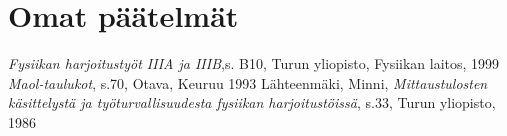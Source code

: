 \documentclass[a4paper,12pt]{article}
\begin{document}

\section{Omat päätelmät}




\newpage
\renewcommand{\refname}{Kirjallisuus}           %

\begin{thebibliography}{9}
 \emph{Fysiikan harjoitustyöt IIIA ja IIIB},s. B10, Turun yliopisto,
Fysiikan laitos, 1999 
 \emph{Maol-taulukot}, s.70, Otava, Keuruu 1993
 Lähteenmäki, Minni, \emph{Mittaustulosten käsittelystä ja työturvallisuudesta
fysiikan harjoitustöissä}, s.33, Turun yliopisto, 1986
\end{thebibliography}
\end{document}
